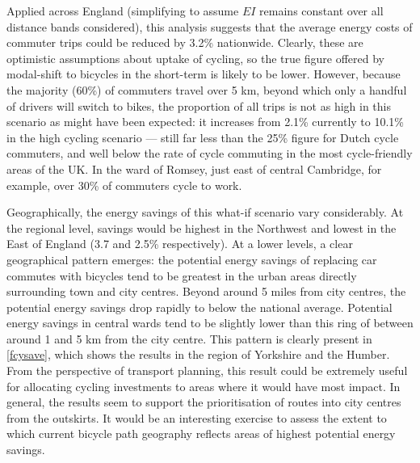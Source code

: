 \documentclass[a4paper, 11pt, twoside]{Thesis}
\begin{document}
Applied across England (simplifying to assume $EI$ remains constant over all
distance bands considered), this analysis suggests that the average energy
costs of commuter trips could be reduced by 3.2\% nationwide. Clearly, these
are optimistic assumptions about uptake of cycling, so the true figure
offered by modal-shift to bicycles in the short-term is likely to be
lower. However, because the majority (60\%) of commuters travel
over 5 km, beyond which only a handful of drivers will switch to bikes, the
proportion of all trips is not as high in this scenario as might
have been expected: it increases from 2.1\% currently to 10.1\% in the high
cycling scenario --- still far less than the 25\% figure for Dutch cycle
commuters, and well below the rate of cycle commuting in the most cycle-friendly
areas of the UK. In the ward of Romsey, just east of central Cambridge, for
example, over 30\% of commuters cycle to work. 

Geographically, the energy savings of this what-if scenario vary considerably.
At the regional level, savings would be highest in the Northwest and lowest in
the East of England (3.7 and 2.5\% respectively).
At a lower levels, a clear geographical pattern emerges: the potential energy
savings of replacing car commutes with bicycles tend to be greatest in the
urban areas directly surrounding town and city centres. Beyond around 5 miles
from city centres, the potential energy savings drop rapidly to below the
national average. Potential energy savings in central wards tend to be slightly
lower than this ring of between around 1 and 5 km from the city centre.
This pattern is clearly present in \cref{fcysave}, which shows the results in
the region of Yorkshire and the Humber. From the perspective of transport
planning, this result could be extremely useful for allocating cycling
investments to areas where it would have most impact.
In general, the results seem to support the prioritisation of routes into
city centres from the outskirts. It would be an interesting exercise to assess
the extent to which current bicycle path geography reflects areas of highest
potential energy savings.
\end{document}
